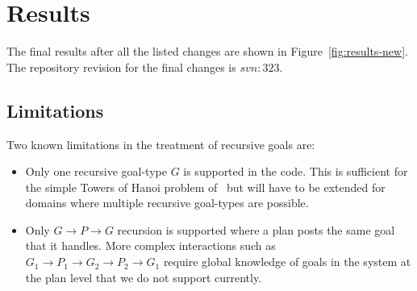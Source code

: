 \documentclass[a4paper]{article}
\begin{document}
\section{Results}

The final results after all the listed changes are shown in Figure~\ref{fig:results-new}. The repository revision for the final changes is $svn:323$.
\begin{figure*}[t]
\begin{center}
\qquad
{}
\qquad
{}
\qquad
{}
\caption{Agent performance under $ACL$ and $ACL+\Omega$ schemes. Each point represents results from $5$ experiment runs using an averaging window of $100$ samples. Repository revision $323$.}
\label{fig:results-new}
\end{center}
\end{figure*}

\subsection{Limitations}
Two known limitations in the treatment of recursive goals are:
\begin{itemize}
\item Only one recursive goal-type $G$ is supported in the code. This is sufficient for the simple Towers of Hanoi problem of~\cite{Singh:HYCAS10} but will have to be extended for domains where multiple recursive goal-types are possible.
\item Only $G \to P \to G$ recursion is supported where a plan posts the same goal that it handles. More complex interactions such as $G_1 \to P_1 \to G_2 \to P_2 \to G_1$ require global knowledge of goals in the system at the plan level that we do not support currently.
\end{itemize}
\end{document}
